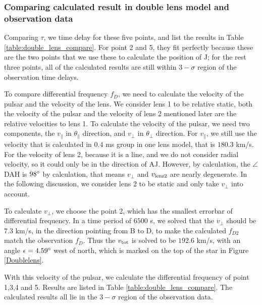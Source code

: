 \documentclass[useAMS,usenatbib]{mn2e}
\begin{document}
\subsubsection{Comparing calculated result in double lens model and observation data}
Comparing $\tau$, we time delay for these five points, and list the results in Table \ref{table:double_lens_compare}. For point 2 and 5, they fit perfectly because these are the two points that we use these to calculate the position of J; for the rest three points, all of the calculated results are still within $3-\sigma$ region of the observation time delays.

To compare differential frequency $f_D$, we need to calculate the velocity of the pulsar and the velocity of the lens. We consider lens 1 to be relative static, both the velocity of the pulsar and the velocity of lens 2 mentioned later are the relative velocities to lens 1.
To calculate the velocity of the pulsar, we need two components, the $v_{\parallel}$ in $\theta_{\parallel}$ direction, and $v_{\bot}$ in $\theta_{\bot}$ direction. For $v_{\parallel}$, we still use the velocity that is calculated in $0.4$ ms group in one lens model, that is $180.3$ km/s. For the velocity of lens 2, because it is a line, and we do not consider radial velocity, so it could only be in the direction of AJ. However, by calculation, the $\angle$DAH is $98\degree$ by calculation, that means $v_{\bot}$ and $v_{\rm lens2}$ are nearly degenerate. In the following discussion, we consider lens 2 to be static and only take $v_{\bot}$ into account.

To calculate $v_{\bot}$, we choose the point 2, which has the smallest errorbar of differential frequency. In a time period of $6500$ s, we solved that the $v_{\bot}$ should be $7.3$ km/s, in the direction pointing from B to D, to make the calculated $f_{D2}$ match the observation $f_D$. Thus the $v_{\rm tot}$ is solved to be $192.6$ km/s, with an angle $\epsilon=4.59\degree$ west of north, which is marked on the top of the star in Figure \ref{Doublelens}.

With this velocity of the pulsar, we calculate the differential frequency of point 1,3,4 and 5. Results are listed in Table \ref{table:double_lens_compare}. The calculated results all lie in the $3-\sigma$ region of the observation data. 

\end{document}
